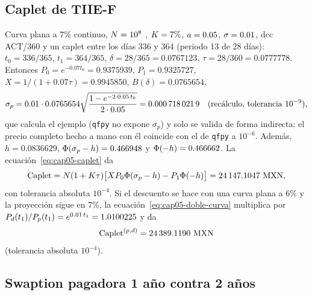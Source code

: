 \subsection{Caplet de TIIE-F}

Curva plana a $7\%$ continuo, $\Nom=10^{8}$ \MXN, $\K=7\%$, $\hwa=0.05$, $\hwsig=0.01$, dcc ACT/360 y un caplet
entre los días 336 y 364 (periodo 13 de 28 días): $t_0=336/365$, $t_1=364/365$, $\delta=28/365=0.0767123$,
$\tau=28/360=0.0777778$. Entonces $P_0=e^{-0.07t_0}=0.9375939$, $P_1=0.9325727$,
$X=1/(1+0.07\tau)=0.9945850$, $B(\delta)=0.0765654$,
\[
  \sigma_p = 0.01\cdot0.0765654\sqrt{\frac{1-e^{-2\cdot0.05\,t_0}}{2\cdot0.05}}
  = \verif{cap05-caplet-sigma-p}{0.0007180219}\quad(\text{recálculo, tolerancia }10^{-9}),
\]
que calcula el ejemplo (\texttt{qfpy} no expone $\sigma_p$) y solo se valida de forma indirecta: el precio completo hecho a mano
con él coincide con el de \texttt{qfpy} a $10^{-6}$. Además, $h=0.0836629$, $\Ncdf(\sigma_p-h)=0.466948$ y $\Ncdf(-h)=0.466662$. La ecuación~\eqref{eq:cap05-caplet} da
\[
  \mathrm{Caplet} = \Nom(1+\K\tau)\bigl[XP_0\Ncdf(\sigma_p-h)-P_1\Ncdf(-h)\bigr]
  = \verif{cap05-caplet-valor}{24147.1047}\ \MXN,
\]
con tolerancia absoluta $10^{-4}$. Si el descuento se hace con una curva plana a $6\%$ y la proyección sigue
en $7\%$, la ecuación~\eqref{eq:cap05-doble-curva} multiplica por $\DF{d}{t_1}/\DF{p}{t_1}=e^{0.01\,t_1}=1.0100225$ y da
\[
  \mathrm{Caplet}^{(p,d)}=\verif{cap05-caplet-doble-curva}{24389.1190}\ \MXN
\]
(tolerancia absoluta $10^{-4}$).

\subsection{Swaption pagadora 1 año contra 2 años}

